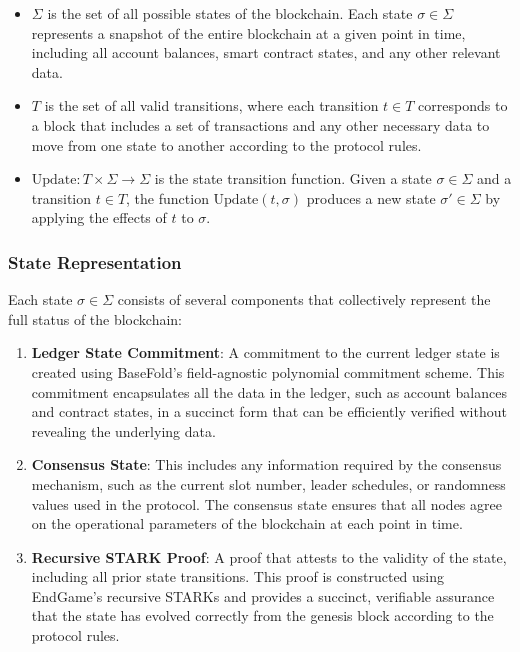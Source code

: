 \documentclass{article}
\theoremstyle{plain}
\theoremstyle{definition}
\theoremstyle{remark}
\theoremstyle{problem}
\begin{document}
\begin{itemize}
    \item $\Sigma$ is the set of all possible states of the blockchain. Each state $\sigma \in \Sigma$ represents a snapshot of the entire blockchain at a given point in time, including all account balances, smart contract states, and any other relevant data.

    \item $T$ is the set of all valid transitions, where each transition $t \in T$ corresponds to a block that includes a set of transactions and any other necessary data to move from one state to another according to the protocol rules.

    \item $\text{Update}: T \times \Sigma \to \Sigma$ is the state transition function. Given a state $\sigma \in \Sigma$ and a transition $t \in T$, the function $\text{Update}(t, \sigma)$ produces a new state $\sigma' \in \Sigma$ by applying the effects of $t$ to $\sigma$.
\end{itemize}

\subsubsection{State Representation}

Each state $\sigma \in \Sigma$ consists of several components that collectively represent the full status of the blockchain:

\begin{enumerate}
    \item \textbf{Ledger State Commitment}: A commitment to the current ledger state is created using BaseFold's field-agnostic polynomial commitment scheme. This commitment encapsulates all the data in the ledger, such as account balances and contract states, in a succinct form that can be efficiently verified without revealing the underlying data.

    \item \textbf{Consensus State}: This includes any information required by the consensus mechanism, such as the current slot number, leader schedules, or randomness values used in the protocol. The consensus state ensures that all nodes agree on the operational parameters of the blockchain at each point in time.

    \item \textbf{Recursive STARK Proof}: A proof that attests to the validity of the state, including all prior state transitions. This proof is constructed using EndGame's recursive STARKs and provides a succinct, verifiable assurance that the state has evolved correctly from the genesis block according to the protocol rules.
\end{enumerate}
\end{document}
